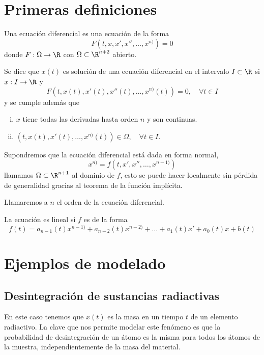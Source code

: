 \documentclass[../main.tex]{subfiles}
\begin{document}
\section{Primeras definiciones}

\begin{definition}
	Una ecuación diferencial es una ecuación de la forma 
	\[F(t, x, x', x'', \dots, x^{n)}) = 0\]
	donde \(F : \Omega \to \R\) con \(\Omega \subset \R^{n + 2}\) abierto.
\end{definition}

Se dice que \(x(t)\) es solución de una ecuación diferencial en el intervalo 
\(I \subset \R\) si \(x : I \to \R\) y
\[F(t, x(t), x'(t), x''(t), \dots, x^{n)}(t)) = 0, \quad \forall t \in I\]
y se cumple además que
\begin{enumerate}[i)]
	\item \(x\) tiene todas las derivadas hasta orden \(n\) y son continuas.
	\item \((t, x(t), x'(t), \dots, x^{n)}(t)) \in \Omega, \quad \forall t \in I\).
\end{enumerate}

Supondremos que la ecuación diferencial está dada en forma normal,
\[x^{n)} = f(t, x', x'', \dots, x^{n - 1)})\]
llamamos \(\Omega \subset \R^{n + 1}\) al dominio de \(f\), esto se puede hacer
localmente sin pérdida de generalidad gracias al teorema de la función
implícita.

\begin{definition}
	Llamaremos a \(n\) el orden de la ecuación diferencial.
\end{definition}

\begin{definition}
	La ecuación es lineal si \(f\) es de la forma
	\[f(t) = a_{n - 1}(t)x^{n - 1)} + a_{n - 2}(t)x^{n - 2)} + 
		\dots + a_1(t)x' + a_0(t)x + b(t)\]
\end{definition}

\section{Ejemplos de modelado}

\subsection{Desintegración de sustancias radiactivas}

En este caso tenemos que \(x(t)\) es
la masa en un tiempo \(t\) de un elemento radiactivo. La clave que nos permite
modelar este fenómeno es que la probabilidad de desintegración de un átomo es la
misma para todos los átomos de la muestra, independientemente de la masa del
material.
\end{document}
